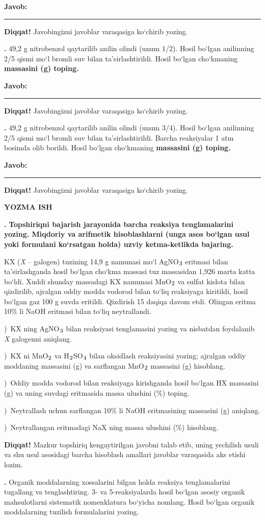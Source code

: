\documentclass[11pt,a4paper]{article}
\renewcommand{\textsubscript}[1]{\ensuremath{_{\text{\fontsize{8}{8}\selectfont #1}}}}
\newcommand{\qn}[1]{\textbf{\fontsize{11.5}{13}\selectfont #1}}
\newcommand{\qsep}{\par\vspace{13pt}}
\newcommand{\diqqat}[1]{\par\smallskip\noindent\textbf{Diqqat!} #1\par\medskip}
\newcommand{\javob}{\par\nopagebreak[4]\smallskip\noindent\textbf{Javob:} \rule[-2pt]{7.5cm}{0.4pt}\par\smallskip\noindent\textbf{Diqqat!} Javobingizni javoblar varaqasiga ko`chirib yozing.\par\medskip}
\begin{document}
\javob\qsep
\noindent\qn{39.} 49,2 g nitrobenzol qaytarilib anilin olindi (unum 1/2). Hosil bo`lgan anilinning 2/5 qismi mo`l bromli suv bilan ta'sirlashtirildi. Hosil bo`lgan cho`kmaning \textbf{massasini (g) toping.}
\javob\qsep
\noindent\qn{40.} 49,2 g nitrobenzol qaytarilib anilin olindi (unum 3/4). Hosil bo`lgan anilinning 2/5 qismi mo`l bromli suv bilan ta'sirlashtirildi. Barcha reaksiyalar 1 atm bosimda olib borildi. Hosil bo`lgan cho`kmaning \textbf{massasini (g) toping.}
\javob\qsep
\par\bigskip\begin{center}\textbf{\fontsize{13}{15}\selectfont YOZMA ISH}\end{center}
\noindent\qn{41.} \textbf{Topshiriqni bajarish jarayonida barcha reaksiya tenglamalarini yozing. Miqdoriy va arifmetik hisoblashlarni (unga asos bo`lgan usul yoki formulani ko`rsatgan holda) uzviy ketma-ketlikda bajaring.}\par\smallskip
KX (\textit{X} -- galogen) tuzining 14,9 g namunasi mo`l AgNO\textsubscript{3} eritmasi bilan ta'sirlashganda hosil bo`lgan cho`kma massasi tuz massasidan 1,926 marta katta bo`ldi. Xuddi shunday massadagi KX namunasi MnO\textsubscript{2} va sulfat kislota bilan qizdirilib, ajralgan oddiy modda vodorod bilan to`liq reaksiyaga kiritildi, hosil bo`lgan gaz 100 g suvda eritildi. Qizdirish 15 daqiqa davom etdi. Olingan eritma 10\% li NaOH eritmasi bilan to`liq neytrallandi.\par
{})\ KX ning AgNO\textsubscript{3} bilan reaksiyasi tenglamasini yozing va nisbatdan foydalanib \textit{X} galogenni aniqlang.\par
{})\ KX ni MnO\textsubscript{2} va H\textsubscript{2}SO\textsubscript{4} bilan oksidlash reaksiyasini yozing; ajralgan oddiy moddaning massasini (g) va sarflangan MnO\textsubscript{2} massasini (g) hisoblang.\par
{})\ Oddiy modda vodorod bilan reaksiyaga kirishganda hosil bo`lgan HX massasini (g) va uning suvdagi eritmasida massa ulushini (\%) toping.\par
{})\ Neytrallash uchun sarflangan 10\% li NaOH eritmasining massasini (g) aniqlang.\par
{})\ Neytrallangan eritmadagi NaX ning massa ulushini (\%) hisoblang.\par
\diqqat{Mazkur topshiriq kengaytirilgan javobni talab etib, uning yechilish usuli va shu usul asosidagi barcha hisoblash amallari javoblar varaqasida aks etishi lozim.}\qsep
\noindent\qn{42.} Organik moddalarning xossalarini bilgan holda reaksiya tenglamalarini tugallang va tenglashtiring. 3- va 5-reaksiyalarda hosil bo`lgan asosiy organik mahsulotlarni sistematik nomenklatura bo`yicha nomlang. Hosil bo`lgan organik moddalarning tuzilish formulalarini yozing.\par
\end{document}

